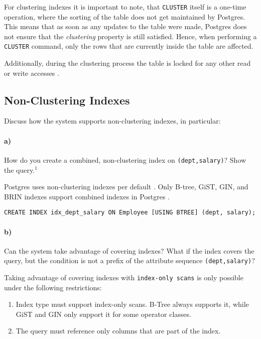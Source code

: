 \documentclass[11pt]{scrartcl}
\begin{document}
For clustering indexes it is important to note, that \texttt{CLUSTER} itself is a one-time operation, where the
sorting of the table does not get maintained by Postgres.
This means that as soon as any updates to the table were made, Postgres does not ensure that the \textit{clustering}
property is still satisfied.
Hence, when performing a \texttt{CLUSTER} command, only the rows that are currently inside the table are affected.

Additionally, during the clustering process the table is locked for any other read or write accesses \cite{PostgreSQL2024Cluster}.

\subsection{Non-Clustering Indexes}

Discuss how the system supports non-clustering indexes, in particular:

\paragraph{a)}

How do you create a combined, non-clustering index on \texttt{(dept,salary)}? Show the query.$^1$

Postgres uses non-clustering indexes per default \cite{SO_PostgresClusterVsNonCluster}.
Only B-tree, GiST, GIN, and BRIN indexes support combined indexes in Postgres \cite{PostgreSQL2024MultiColumnIndex}.

\begin{lstlisting}[style=dbtsql]
CREATE INDEX idx_dept_salary ON Employee [USING BTREE] (dept, salary);
\end{lstlisting}

\paragraph{b)}

Can the system take advantage of covering indexes? What if the index covers the query, but the condition is not a prefix of the attribute sequence \texttt{(dept,salary)}?

Taking advantage of covering indexes with \texttt{index-only scans} is only possible under the following restrictions:

\begin{enumerate}
    \item Index type must support index-only scans. B-Tree always supports it, while GiST and GIN only support it for some operator classes.
    \item The query must reference only columns that are part of the index.
\end{enumerate}
\end{document}
